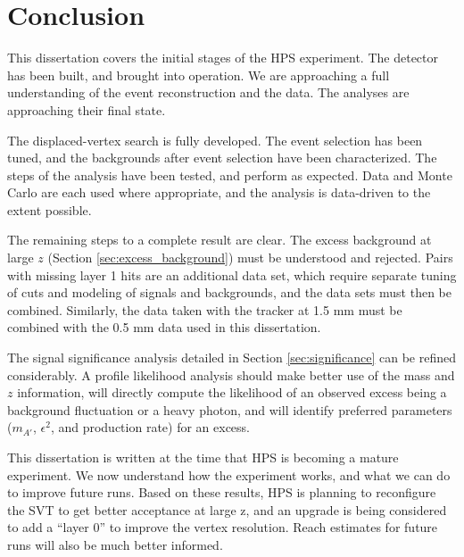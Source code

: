 \chapter{Conclusion}
This dissertation covers the initial stages of the HPS experiment.
The detector has been built, and brought into operation.
We are approaching a full understanding of the event reconstruction and the data.
The analyses are approaching their final state.

The displaced-vertex search is fully developed.
The event selection has been tuned, and the backgrounds after event selection have been characterized.
The steps of the analysis have been tested, and perform as expected.
Data and Monte Carlo are each used where appropriate, and the analysis is data-driven to the extent possible.

The remaining steps to a complete result are clear.
The excess background at large $z$ (Section \ref{sec:excess_background}) must be understood and rejected.
Pairs with missing layer 1 hits are an additional data set, which require separate tuning of cuts and modeling of signals and backgrounds, and the data sets must then be combined.
Similarly, the data taken with the tracker at 1.5 mm must be combined with the 0.5 mm data used in this dissertation.

The signal significance analysis detailed in Section \ref{sec:significance} can be refined considerably.
A profile likelihood analysis should make better use of the mass and $z$ information, will directly compute the likelihood of an observed excess being a background fluctuation or a heavy photon, and will identify preferred parameters ($m_{A'}$, $\epsilon^2$, and production rate) for an excess.

This dissertation is written at the time that HPS is becoming a mature experiment.
We now understand how the experiment works, and what we can do to improve future runs.
Based on these results, HPS is planning to reconfigure the SVT to get better acceptance at large z, and an upgrade is being considered to add a ``layer 0'' to improve the vertex resolution.
Reach estimates for future runs will also be much better informed.
